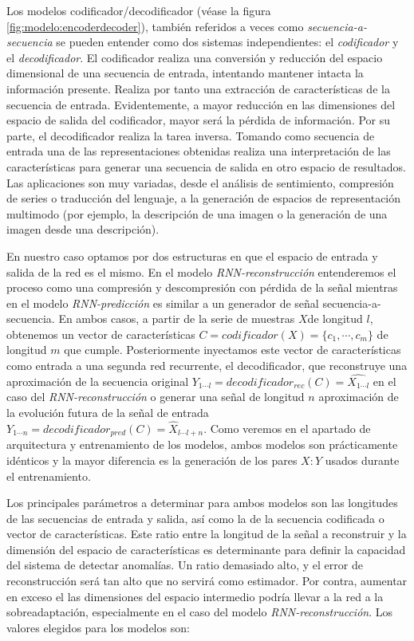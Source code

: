 Los modelos codificador/decodificador (véase la figura \ref{fig:modelo:encoderdecoder}), también referidos a veces como \textit{secuencia-a-secuencia} se pueden entender como dos sistemas independientes: el \textit{codificador} y el \textit{decodificador}. El codificador realiza una conversión y reducción del espacio dimensional de una secuencia de entrada, intentando mantener intacta la información presente. Realiza por tanto una extracción de características de la secuencia de entrada. Evidentemente, a mayor reducción en las dimensiones del espacio de salida del codificador, mayor será la pérdida de información. Por su parte, el decodificador realiza la tarea inversa. Tomando como secuencia de entrada una de las representaciones obtenidas realiza una interpretación de las características para generar una secuencia de salida en otro espacio de resultados. Las aplicaciones son muy variadas, desde el análisis de sentimiento, compresión de series o traducción del lenguaje, a la generación de espacios de representación multimodo (por ejemplo, la descripción de una imagen o la generación de una imagen desde una descripción). 

En nuestro caso optamos por dos estructuras en que el espacio de entrada y salida de la red es el mismo. En el modelo \textit{RNN-reconstrucción} entenderemos el proceso como una compresión y descompresión con pérdida de la señal mientras en el modelo \textit{RNN-predicción} es similar a un generador de señal secuencia-a-secuencia. En ambos casos, a partir de la serie de muestras $X$de longitud $l$, obtenemos un vector de características $C=codificador(X)=\{c_1,\cdots,c_m\}$ de longitud $m$ que cumple. Posteriormente inyectamos este vector de características como entrada a una segunda red recurrente, el decodificador, que reconstruye una aproximación de la secuencia original $Y_{1\cdots l}=decodificador_{rec}(C)=\hat{X_{1\cdots l}}$ en el caso del \textit{RNN-reconstrucción} o generar una señal de longitud $n$ aproximación de la evolución futura de la señal de entrada $Y_{1\cdots n}=decodificador_{pred}(C)=\hat{X}_{l\cdots l+n}$. Como veremos en el apartado de arquitectura y entrenamiento de los modelos, ambos modelos son prácticamente idénticos y la mayor diferencia es la generación de los pares $X:Y$ usados durante el entrenamiento.

Los principales parámetros a determinar para ambos modelos son las longitudes de las secuencias de entrada y salida, así como la de la secuencia codificada o vector de características. Este ratio entre la longitud de la señal a reconstruir y la dimensión del espacio de características es determinante para definir la capacidad del sistema de detectar anomalías. Un ratio demasiado alto, y el error de reconstrucción será tan alto que no servirá como estimador. Por contra, aumentar en exceso el las dimensiones del espacio intermedio podría llevar a la red a la sobreadaptación, especialmente en el caso del modelo \textit{RNN-reconstrucción}. Los valores elegidos para los modelos son:

